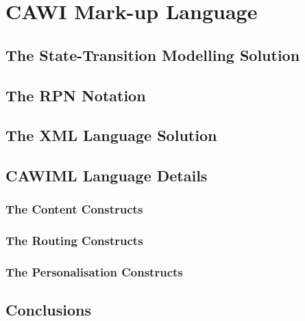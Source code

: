 \chapter{CAWI Mark-up Language}\label{ch:cawiLanguage}	
		
	\section{The State-Transition Modelling Solution}\label{sec:cawiLanguage:stateTransition}
		

	\section{The RPN Notation}\label{sec:cawiLanguage:rpn}
		

	\section{The XML Language Solution}\label{sec:cawiLanguage:xmlLanguage}
		

	\section{CAWIML Language Details}\label{sec:cawiLanguage:cawiml}
		
		\subsection{The Content Constructs}\label{sec:cawiLanguage:contentConstructs}
			
		\subsection{The Routing Constructs}\label{sec:cawiLanguage:routingConstructs}
			
		\subsection{The Personalisation Constructs}\label{sec:cawiLanguage:personalisationConstructs}
			

	\section{Conclusions}\label{sec:cawiLanguage:conclusion}
		